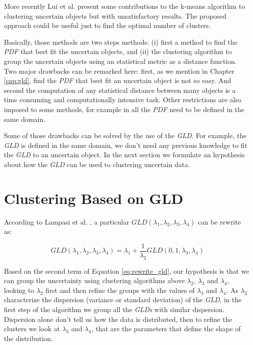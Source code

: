 More recently Lui et al. \cite{Liu2018} present some contributions to the k-means algorithm to clustering uncertain objects but with unsatisfactory results. The proposed approach could be useful just to find the optimal number of clusters. 

Basically, those methods are two steps methods: (i) first a method to find the \textit{PDF} that best fit the uncertain objects, and (ii) the clustering algorithm to group the uncertain objects using an statistical metric as a distance function. Two major drawbacks can be remarked here: first, as we mention in Chapter \ref{cap:gld}, find the \textit{PDF} that best fit an uncertain object is not so easy. And second the computation of any statistical distance between many objects is a time consuming and computationally intensive task. Other restrictions are also imposed to some methods, for example in \cite{Jiang2011} all the \textit{PDF} need to be defined in the same domain.

Some of those drawbacks can be solved by the use of the \textit{GLD}. For example, the \textit{GLD} is defined in the same domain, we don't need any previous knowledge to fit the \textit{GLD} to an uncertain object. In the next section we formulate an hypothesis about how the \textit{GLD} can be used to clustering uncertain data.   

\section{Clustering Based on GLD}\label{sec:clustering_gld}

According to Lampasi et al. \cite{Lampasi2006}, a particular $GLD(\lambda_{1},\lambda_{2},\lambda_{3},\lambda_{4})$ can be rewrite as: 

\begin{equation}\label{eq:rewrite_gld}
GLD(\lambda_{1},\lambda_{2},\lambda_{3},\lambda_{4}) = \lambda_{1} + \frac{1}{\lambda_{2}}GLD(0,1,\lambda_{3},\lambda_{4}) 
\end{equation}

Based on the second term of Equation \ref{eq:rewrite_gld}, our hypothesis is that we can group the uncertainty using clustering algorithms above $\lambda_{2}$, $\lambda_{3}$ and $\lambda_{4}$, looking to $\lambda_{2}$ first and then refine the groups with the values of $\lambda_{3}$ and $\lambda_{4}$. As $\lambda_{2}$ characterize the dispersion (variance or standard deviation) of the \textit{GLD}, in the first step of the algorithm we group all the \textit{GLDs} with similar dispersion. Dispersion alone don't tell us how the data is distributed, then to refine the clusters we look at $\lambda_{3}$ and $\lambda_{4}$, that are the parameters that define the shape of the distribution.   

